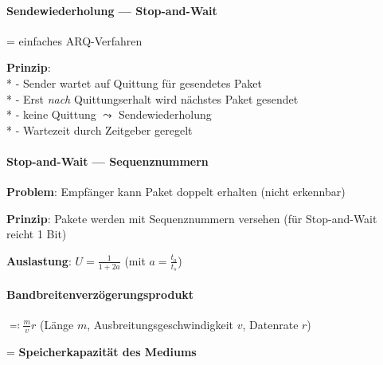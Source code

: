 \paragraph{Sendewiederholung --- Stop-and-Wait}
\begin{items}
  \item = einfaches ARQ-Verfahren
  \item \textbf{Prinzip}: \\*
    - Sender wartet auf Quittung für gesendetes Paket \\*
    - Erst \emph{nach} Quittungserhalt wird nächstes Paket gesendet \\*
    - keine Quittung \( \leadsto \) Sendewiederholung \\*
    - Wartezeit durch Zeitgeber geregelt
\end{items}

\paragraph{Stop-and-Wait --- Sequenznummern}
\begin{items}
  \item \textbf{Problem}: Empfänger kann Paket doppelt erhalten (nicht erkennbar)
  \item \textbf{Prinzip}: Pakete werden mit Sequenznummern versehen (für Stop-and-Wait reicht 1 Bit)
  \item \textbf{Auslastung}: \( U = \tfrac{1}{1+2a} \) (mit \( a = \tfrac{t_a}{t_s} \))
\end{items}

\paragraph{Bandbreitenverzögerungsprodukt}
\begin{items}
  \item \( \eqqcolon \tfrac{m}{v}r \) (Länge \( m \), Ausbreitungsgeschwindigkeit \( v \), Datenrate \( r \))
  \item = \textbf{Speicherkapazität des Mediums}
\end{items}

